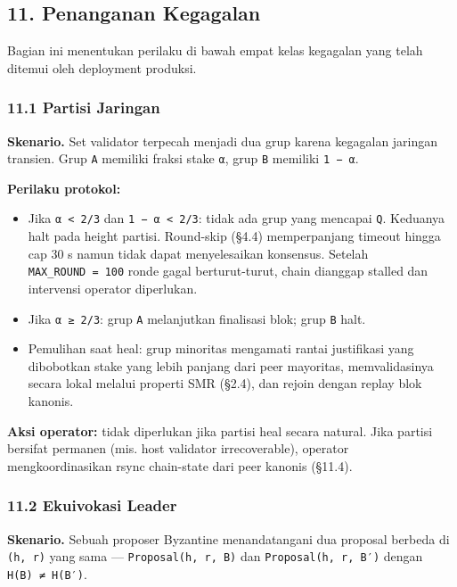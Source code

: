 \documentclass[11pt,a4paper]{article}
\providecommand{\tightlist}{\setlength{\itemsep}{0pt}\setlength{\parskip}{0pt}}
\begin{document}
\hypertarget{penanganan-kegagalan}{%
\subsection{11. Penanganan Kegagalan}\label{penanganan-kegagalan}}

Bagian ini menentukan perilaku di bawah empat kelas kegagalan yang telah ditemui oleh deployment produksi.

\hypertarget{partisi-jaringan}{%
\subsubsection{11.1 Partisi Jaringan}\label{partisi-jaringan}}

\textbf{Skenario.} Set validator terpecah menjadi dua grup karena kegagalan jaringan transien. Grup \texttt{A} memiliki fraksi stake \texttt{α}, grup \texttt{B} memiliki \texttt{1\ −\ α}.

\textbf{Perilaku protokol:}

\begin{itemize}
\tightlist
\item
  Jika \texttt{α\ \textless{}\ 2/3} dan \texttt{1\ −\ α\ \textless{}\ 2/3}: tidak ada grup yang mencapai \texttt{Q}. Keduanya halt pada height partisi. Round-skip (§4.4) memperpanjang timeout hingga cap 30 s namun tidak dapat menyelesaikan konsensus. Setelah \texttt{MAX\_ROUND\ =\ 100} ronde gagal berturut-turut, chain dianggap stalled dan intervensi operator diperlukan.
\item
  Jika \texttt{α\ ≥\ 2/3}: grup \texttt{A} melanjutkan finalisasi blok; grup \texttt{B} halt.
\item
  Pemulihan saat heal: grup minoritas mengamati rantai justifikasi yang dibobotkan stake yang lebih panjang dari peer mayoritas, memvalidasinya secara lokal melalui properti SMR (§2.4), dan rejoin dengan replay blok kanonis.
\end{itemize}

\textbf{Aksi operator:} tidak diperlukan jika partisi heal secara natural. Jika partisi bersifat permanen (mis. host validator irrecoverable), operator mengkoordinasikan rsync chain-state dari peer kanonis (§11.4).

\hypertarget{ekuivokasi-leader}{%
\subsubsection{11.2 Ekuivokasi Leader}\label{ekuivokasi-leader}}

\textbf{Skenario.} Sebuah proposer Byzantine menandatangani dua proposal berbeda di \texttt{(h,\ r)} yang sama --- \texttt{Proposal(h,\ r,\ B)} dan \texttt{Proposal(h,\ r,\ B′)} dengan \texttt{H(B)\ ≠\ H(B′)}.
\end{document}
